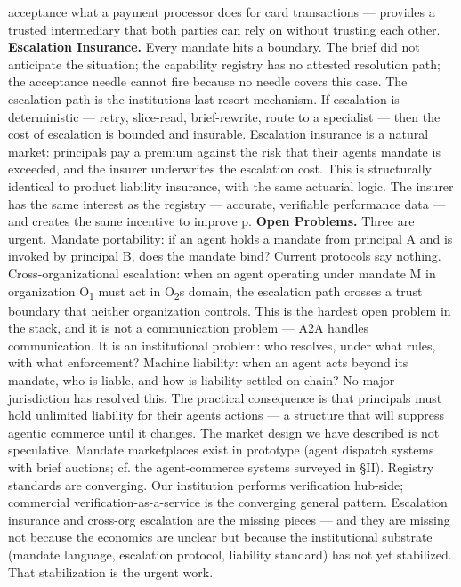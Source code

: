 \documentclass[
]{article}
\begin{document}
acceptance what a payment processor does for card transactions ---
provides a trusted intermediary that both parties can rely on without
trusting each other. \textbf{Escalation Insurance.} Every mandate hits a
boundary. The brief did not anticipate the situation; the capability
registry has no attested resolution path; the acceptance needle cannot
fire because no needle covers this case. The escalation path is the
institution\textquotesingle s last-resort mechanism. If escalation is
deterministic --- retry, slice-read, brief-rewrite, route to a
specialist --- then the cost of escalation is bounded and insurable.
Escalation insurance is a natural market: principals pay a premium
against the risk that their agent\textquotesingle s mandate is exceeded,
and the insurer underwrites the escalation cost. This is structurally
identical to product liability insurance, with the same actuarial logic.
The insurer has the same interest as the registry --- accurate,
verifiable performance data --- and creates the same incentive to
improve p. \textbf{Open Problems.} Three are urgent. Mandate
portability: if an agent holds a mandate from principal A and is invoked
by principal B, does the mandate bind? Current protocols say nothing.
Cross-organizational escalation: when an agent operating under mandate M
in organization O\textsubscript{1} must act in O\textsubscript{2}\textquotesingle s domain, the
escalation path crosses a trust boundary that neither organization
controls. This is the hardest open problem in the stack, and it is not a
communication problem --- A2A handles communication. It is an
institutional problem: who resolves, under what rules, with what
enforcement? Machine liability: when an agent acts beyond its mandate,
who is liable, and how is liability settled on-chain? No major
jurisdiction has resolved this. The practical consequence is that
principals must hold unlimited liability for their
agents\textquotesingle{} actions --- a structure that will suppress
agentic commerce until it changes. The market design we have described
is not speculative. Mandate marketplaces exist in prototype (agent
dispatch systems with brief auctions; cf. the agent-commerce systems
surveyed in \S{}II). Registry standards are converging. Our institution
performs verification hub-side; commercial verification-as-a-service is
the converging general pattern. Escalation insurance and cross-org
escalation are the missing pieces --- and they are missing not because
the economics are unclear but because the institutional substrate
(mandate language, escalation protocol, liability standard) has not yet
stabilized. That stabilization is the urgent work.
\end{document}

